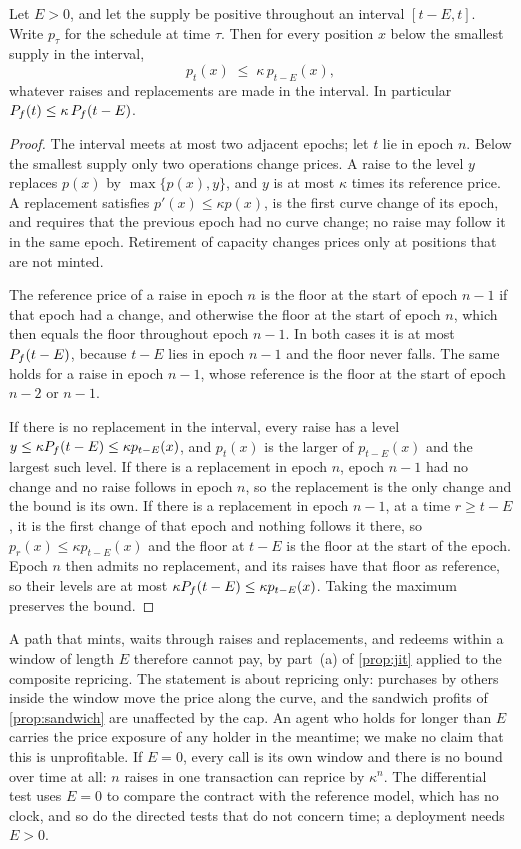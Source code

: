 \begin{lemma}\label{lem:window}
Let $E>0$, and let the supply be positive throughout an interval $[t-E,t]$. Write $p_\tau$ for the schedule at time $\tau$. Then for every position $x$ below the smallest supply in the interval,
\[
p_t(x)\;\le\;\kappa\,p_{t-E}(x),
\]
whatever raises and replacements are made in the interval. In particular $P_f(t)\le\kappa\,P_f(t-E)$.
\end{lemma}
\begin{proof}
The interval meets at most two adjacent epochs; let $t$ lie in epoch $n$. Below the smallest supply only two operations change prices. A raise to the level $y$ replaces $p(x)$ by $\max\{p(x),y\}$, and $y$ is at most $\kappa$ times its reference price. A replacement satisfies $p'(x)\le\kappa p(x)$, is the first curve change of its epoch, and requires that the previous epoch had no curve change; no raise may follow it in the same epoch. Retirement of capacity changes prices only at positions that are not minted.

The reference price of a raise in epoch $n$ is the floor at the start of epoch $n-1$ if that epoch had a change, and otherwise the floor at the start of epoch $n$, which then equals the floor throughout epoch $n-1$. In both cases it is at most $P_f(t-E)$, because $t-E$ lies in epoch $n-1$ and the floor never falls. The same holds for a raise in epoch $n-1$, whose reference is the floor at the start of epoch $n-2$ or $n-1$.

If there is no replacement in the interval, every raise has a level $y\le\kappa P_f(t-E)\le\kappa p_{t-E}(x)$, and $p_t(x)$ is the larger of $p_{t-E}(x)$ and the largest such level. If there is a replacement in epoch $n$, epoch $n-1$ had no change and no raise follows in epoch $n$, so the replacement is the only change and the bound is its own. If there is a replacement in epoch $n-1$, at a time $r\ge t-E$, it is the first change of that epoch and nothing follows it there, so $p_r(x)\le\kappa p_{t-E}(x)$ and the floor at $t-E$ is the floor at the start of the epoch. Epoch $n$ then admits no replacement, and its raises have that floor as reference, so their levels are at most $\kappa P_f(t-E)\le\kappa p_{t-E}(x)$. Taking the maximum preserves the bound.
\end{proof}

A path that mints, waits through raises and replacements, and redeems within a window of length $E$ therefore cannot pay, by part~(a) of \cref{prop:jit} applied to the composite repricing. The statement is about repricing only: purchases by others inside the window move the price along the curve, and the sandwich profits of \cref{prop:sandwich} are unaffected by the cap. An agent who holds for longer than $E$ carries the price exposure of any holder in the meantime; we make no claim that this is unprofitable. If $E=0$, every call is its own window and there is no bound over time at all: $n$ raises in one transaction can reprice by $\kappa^n$. The differential test uses $E=0$ to compare the contract with the reference model, which has no clock, and so do the directed tests that do not concern time; a deployment needs $E>0$.

